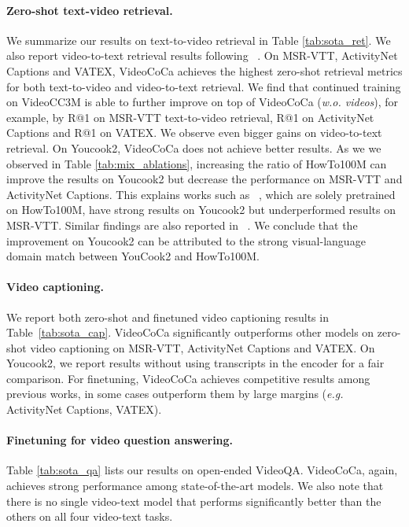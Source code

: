 \vspace{-4mm}
\paragraph{Zero-shot text-video retrieval.}


We summarize our results on text-to-video retrieval in Table \ref{tab:sota_ret}. We also report video-to-text retrieval results following ~\cite{zeng2022socratic}. On MSR-VTT, ActivityNet Captions and VATEX, VideoCoCa achieves the highest zero-shot retrieval metrics for both text-to-video and video-to-text retrieval. We find that continued training on VideoCC3M is able to further improve on top of VideoCoCa (\textit{w.o. videos}), for example, by  R@1 on MSR-VTT text-to-video retrieval,  R@1 on ActivityNet Captions and  R@1 on VATEX. We observe even bigger gains on video-to-text retrieval. On Youcook2, VideoCoCa does not achieve better results. As we we observed in Table \ref{tab:mix_ablations}, increasing the ratio of HowTo100M can improve the results on Youcook2 but decrease the performance on MSR-VTT and ActivityNet Captions. This explains works such as ~\cite{yang2021taco,xu2021videoclip}, which are solely pretrained on HowTo100M, have strong results on Youcook2 but underperformed results on MSR-VTT. Similar findings are also reported in ~\cite{castro2022fitclip}. We conclude that the improvement on Youcook2 can be attributed to the strong visual-language domain match between YouCook2 and HowTo100M.  




\paragraph{Video captioning.}



We report both zero-shot and finetuned video captioning results in Table~\ref{tab:sota_cap}.  VideoCoCa significantly outperforms other models on zero-shot video captioning on MSR-VTT, ActivityNet Captions and VATEX. On Youcook2, we report results without using transcripts in the encoder for a fair comparison. For finetuning, VideoCoCa achieves competitive results among previous works, in some cases outperform them by large margins (\emph{e.g.} ActivityNet Captions, VATEX).





\paragraph{Finetuning for video question answering.}




Table \ref{tab:sota_qa} lists our results on open-ended VideoQA. VideoCoCa, again, achieves strong performance among state-of-the-art models. We also note that there is no single video-text model that performs significantly better than the others on all four video-text tasks.





















